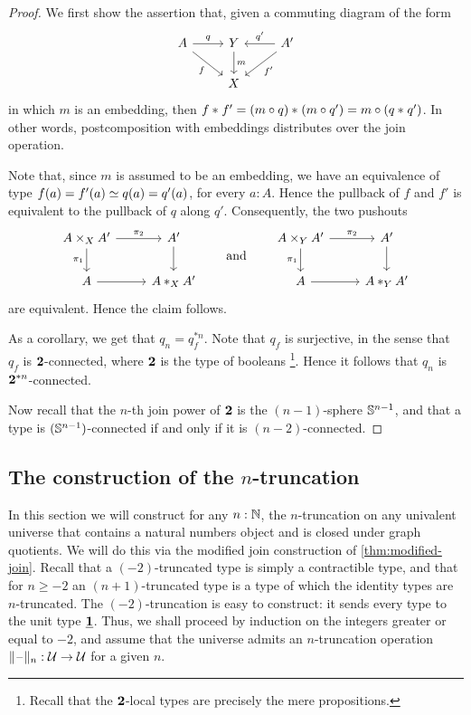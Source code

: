 \begin{proof}
We first show the assertion that, given a commuting diagram of the form
\begin{equation*}
\begin{tikzcd}
A \arrow[r,"q"] \arrow[dr,swap,"f"] & Y \arrow[d,"m"] & A' \arrow[l,swap,"{q'}"] \arrow[dl,"{f'}"] \\
& X
\end{tikzcd}
\end{equation*}
in which $m$ is an embedding, then ${f}\ast_{}{f'}={(m\circ q)}\ast_{}{(m\circ q')}=m\circ ({q}\ast_{}{q'})$.
In other words, postcomposition with embeddings distributes over 
the join operation.

Note that, since $m$ is assumed to be an embedding, we have an equivalence of
type $\eqv{f(a)=f'(a)}{q(a)=q'(a)}$, for every $a:A$. Hence the pullback of
$f$ and $f'$ is equivalent to the pullback of $q$ along $q'$. Consequently, the
two pushouts
\begin{equation*}
\begin{tikzcd}
A\times_X A' \arrow[r,"\pi_2"] \arrow[d,swap,"\pi_1"] & A' \arrow[d] \\
A \arrow[r] & \join[X]{A}{A'}
\end{tikzcd}
\qquad\text{and}\qquad
\begin{tikzcd}
A\times_Y A' \arrow[r,"\pi_2"] \arrow[d,swap,"\pi_1"] & A' \arrow[d] \\
A \arrow[r] & \join[Y]{A}{A'}
\end{tikzcd}
\end{equation*}
are equivalent. Hence the claim follows.

As a corollary, we get that $q_n=q_f^{\ast n}$. Note that $q_f$ is surjective,
in the sense that $q_f$ is $\mathbf{2}$-connected, where $\mathbf{2}$ is the type of booleans%
\footnote{Recall that the $\mathbf{2}$-local types are precisely the mere propositions.}.
Hence it follows that $q_n$ is $\mathbf{2}^{\ast n}$-connected. 

Now recall that the $n$-th join power of $\mathbf{2}$ is the $(n-1)$-sphere $\mathbb{S}^{n-1}$, and that
a type is $(\mathbb{S}^{n-1})$-connected if and only if it is $(n-2)$-connected.
\end{proof}

\subsection{The construction of the $n$-truncation}\label{sec:truncation}

In this section we will construct for any $n:\mathbb{N}$, the $n$-truncation on any univalent universe that contains
a natural numbers object and is closed under graph quotients.
We will do this via the modified join construction of \autoref{thm:modified-join}.
Recall that a $(-2)$-truncated type is simply a contractible type, and that
for $n\geq -2$ an $(n+1)$-truncated type is a type of which the identity types
are $n$-truncated. The $(-2)$-truncation is easy to construct: it sends
every type to the unit type $\underline{\mathbf{1}}$. Thus, we shall proceed by induction
on the integers greater or equal to $-2$, and assume that the universe admits
an $n$-truncation operation $\Vert \mathord{\hspace{1pt}\text{--}\hspace{1pt}}\Vert_{n}:\mathcal{U}\to\mathcal{U}$ for a given $n$.

